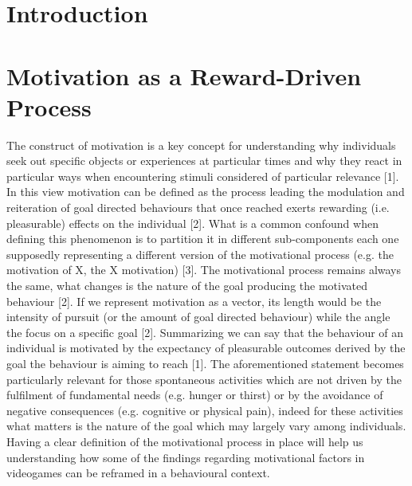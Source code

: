 \section{Introduction}
\label{motivation_engagement_introduction}

\section{Motivation as a Reward-Driven Process}
\label{motivation}

The construct of motivation is a key concept for understanding why individuals seek out specific objects or experiences at particular times and why they react in particular ways when encountering stimuli considered of particular relevance [1]. In this view motivation can be defined as the process leading the modulation and reiteration of goal directed behaviours that once reached exerts rewarding (i.e. pleasurable) effects on the individual [2]. What is a common confound when defining this phenomenon is to partition it in different sub-components each one supposedly representing a different version of the motivational process (e.g. the motivation of X, the X motivation) [3]. The motivational process remains always the same, what changes is the nature of the goal producing the motivated behaviour [2]. If we represent motivation as a vector, its length would be the intensity of pursuit (or the amount of goal directed behaviour) while the angle the focus on a specific goal [2]. Summarizing we can say that the behaviour of an individual is motivated by the expectancy of pleasurable outcomes derived by the goal the behaviour is aiming to reach [1]. The aforementioned statement becomes particularly relevant for those spontaneous activities which are not driven by the fulfilment of fundamental needs (e.g. hunger or thirst) or by the avoidance of negative consequences (e.g. cognitive or physical pain), indeed for these activities what matters is the nature of the goal which may largely vary among individuals. Having a clear definition of the motivational process in place will help us understanding how some of the findings regarding motivational factors in videogames can be reframed in a behavioural context.

